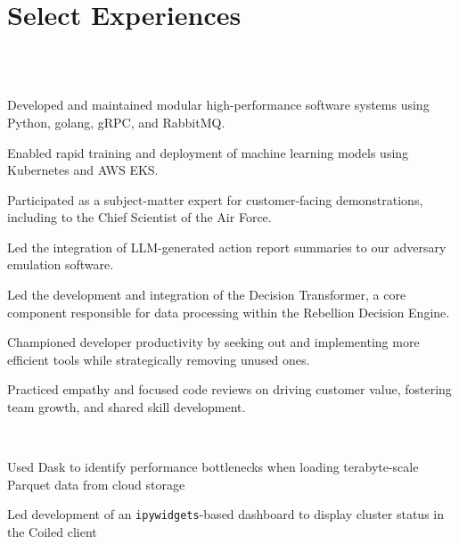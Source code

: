 \section{Select Experiences}
\\
\\
\begin{tightemize}
\item Developed and maintained modular high-performance software systems using Python, golang, gRPC, and RabbitMQ.
\item Enabled rapid training and deployment of machine learning models using Kubernetes and AWS EKS.
\item Participated as a subject-matter expert for customer-facing demonstrations, including to the Chief Scientist of the Air Force.
\item Led the integration of LLM-generated action report summaries to our adversary emulation software.
\item Led the development and integration of the Decision Transformer, a core component responsible for data processing within the Rebellion Decision Engine.
\item Championed developer productivity by seeking out and implementing more efficient tools while strategically removing unused ones.
\item Practiced empathy and focused code reviews on driving customer value, fostering team growth, and shared skill development.
\end{tightemize}
\sectionsep

\\

\begin{tightemize}
\item Used Dask to identify performance bottlenecks when loading terabyte-scale Parquet data from cloud storage
\item Led development of an \verb|ipywidgets|-based dashboard to display cluster status in the Coiled client
\end{tightemize}
\sectionsep

